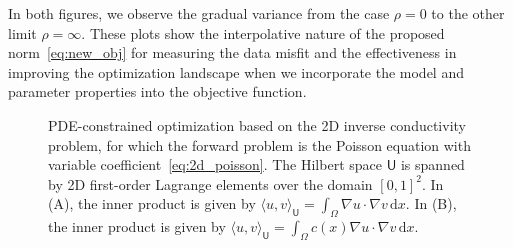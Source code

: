 \documentclass[12pt]{amsart}
\begin{document}
In both figures, we observe the gradual variance from the case $\rho = 0$ to the other limit $\rho = \infty$. These plots show the interpolative nature of the proposed norm~\eqref{eq:new_obj} for measuring the data misfit and the effectiveness in improving the optimization landscape when we incorporate the model and parameter properties into the objective function.

\begin{figure}[ht!]
    \centering
    \caption{PDE-constrained optimization based on the 2D inverse conductivity problem, for which the forward problem is the Poisson equation with variable coefficient~\eqref{eq:2d_poisson}. The Hilbert space $\mathsf{U}$ is spanned by 2D first-order Lagrange elements over the domain $[0,1]^2$.  In (A), the inner product is given by  $\langle u, v\rangle_{\mathsf{U}} = \int_\Omega \nabla u \cdot \nabla v  \,  \mathrm{d}x$. In (B), the inner product is given by $\langle u, v\rangle_{\mathsf{U}} = \int_\Omega c(x) \nabla u \cdot \nabla v  \,  \mathrm{d}x$. }\label{fig:Poisson2D_full_basis}
\end{figure}

\end{document}
